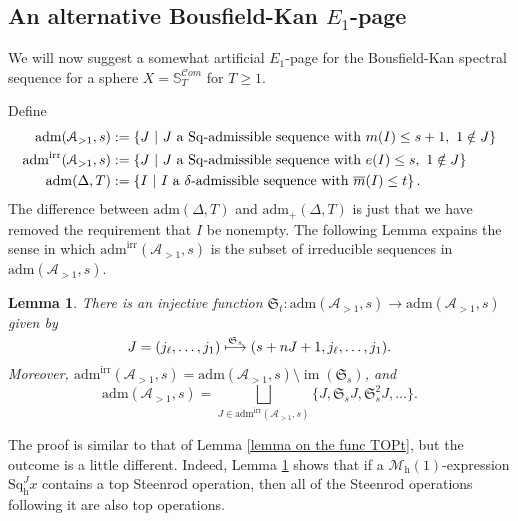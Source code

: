 \documentclass[11pt]{amsart} \renewcommand{\baselinestretch}{1.4}
\theoremstyle{plain}
\newtheorem{lem}[thm]{Lemma}
\theoremstyle{definition}
\DeclareMathOperator{\im}{im}
\renewcommand{\to}{\longrightarrow}
\newcommand{\scrC}{\mathscr{C}}
\newcommand{\calA}{\mathcal{A}}
\newcommand{\calMh}{\mathcal{M}\dhor}
\newcommand{\minDimP}{\overline{m}}
\newcommand{\minDimDelta}{m}
\newcommand{\Sq}{\mathrm{Sq}}
\newcommand{\LieSteen}{\calA}
\newcommand{\aDT}{\mathrm{adm}_+(\Delta,T)}
\newcommand{\aDTnoplus}{\mathrm{adm}(\Delta,T)}
\newcommand{\aS}[1]{\mathrm{adm}(\LieSteen_{>1},#1)}
\newcommand{\aSirr}[1]{\mathrm{adm}^\mathrm{irr}(\LieSteen_{>1},#1)}
\newcommand{\algs}{{\scrC\!\textit{om}}}
\newcommand{\STOP}{\mathfrak{S}}
\newcommand{\dhor}{_\mathrm{h}}
\newcommand{\Sqh}{\mathrm{Sq}\dhor}
\begin{document}
\begin{Calculations of HWn for n nonzero}
\subsection{An alternative Bousfield-Kan $E_1$-page}
We will now suggest a somewhat artificial $E_1$-page for the Bousfield-Kan spectral sequence for a  sphere  $X=\mathbb{S}_{T}^{\algs}$ for $T\geq1$. 

Define
\begin{alignat*}{2}
\aS{s}&:=\left\{J\ \middle|\ \textup{$J$ a $\Sq$-admissible sequence with }\minDimDelta(I)\leq s+1,\ 1\notin J\right\}\\
\aSirr{s}&:=\left\{J\ \middle|\ \textup{$J$ a $\Sq$-admissible sequence with }e(I)\leq s,\ 1\notin J\right\}\\
\aDTnoplus&:=\left\{I\ \middle|\ \textup{$I$ a $\delta$-admissible sequence with }\minDimP(I)\leq t\right\}.
\end{alignat*}
The difference between $\aDTnoplus$ and $\aDT$ is just that we have removed the requirement that $I$ be nonempty. The following Lemma expains the sense in which $\aSirr{s}$ is the subset of irreducible sequences in $\aS{s}$.
\begin{lem}
\label{lemma on the func STOPs}
There is an injective function $\STOP_t:\aS{s}\to \aS{s}$ given by
\[J=(j_{\ell},\ldots,j_1)\overset{\smash{\STOP_s}}{\longmapsto }(s+nJ+1,j_\ell,\ldots,j_1).\]
Moreover, $\aSirr{s}=\aS{s}\setminus\im(\STOP_s)$, and
\[\aS{s}=\textstyle\bigsqcup_{J\in \aSirr{s}}\{J,\STOP_s J,\STOP_s^2 J,\ldots\}.\]
\end{lem}
\noindent The proof is similar to that of Lemma \ref{lemma on the func TOPt}, but the outcome is a little different. Indeed, Lemma \ref{lemma on the func STOPs} shows that if a $\calMh(1)$-expression $\Sqh^{J}x$ contains a top Steenrod operation, then all of the Steenrod operations following it are also top operations.


\end{Calculations of HWn for n nonzero}
\end{document}
